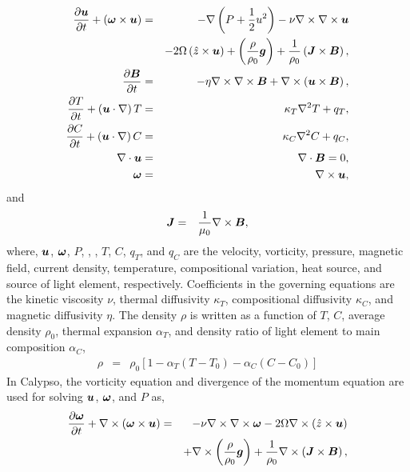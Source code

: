 \begin{eqnarray}
\frac{\partial \mbox{\boldmath$u$}}{\partial t} + \left(\mbox{\boldmath$\omega$} \times \mbox{\boldmath$u$}\right)
 & = & - \nabla \left(P+\frac{1}{2}u^{2} \right) -\nu \nabla \times \nabla \times \mbox{\boldmath$u$}
\nonumber \\
 & &  - 2 \Omega \left(\hat{z} \times \mbox{\boldmath$u$} \right)
     + \left( \frac{\rho}{\rho_{0}} \mbox{\boldmath$g$} \right)
     + \frac{1}{\rho_{0}} \left(\mbox{\boldmath$J$} \times \mbox{\boldmath$B$} \right),
\nonumber \\
 \frac{\partial \mbox{\boldmath$B$}}{\partial t}
 & = & -\eta \nabla \times \nabla \times \mbox{\boldmath$B$}
       + \nabla \times \left(\mbox{\boldmath$u$} \times \mbox{\boldmath$B$} \right),
\nonumber \\
\frac{\partial T}{\partial t} + \left(\mbox{\boldmath$u$} \cdot \nabla \right) T
 & = & \kappa_{T} \nabla^{2} T + q_{T},
\nonumber \\
\frac{\partial C}{\partial t} + \left(\mbox{\boldmath$u$} \cdot \nabla \right) C
 & = & \kappa_{C} \nabla^{2} C + q_{C},
\nonumber \\
\nabla \cdot \mbox{\boldmath$u$} & = & \nabla \cdot \mbox{\boldmath$B$} = 0,
\label{eq:conservation}
\nonumber \\
\mbox{\boldmath$\omega$} & = & \nabla \times \mbox{\boldmath$u$},
\nonumber
\end{eqnarray}
%
and
\begin{eqnarray}
\mbox{\boldmath$J$} & = & \frac{1}{\mu_{0}} \nabla \times \mbox{\boldmath$B$},
\nonumber
\end{eqnarray}
%
where, $\mbox{\boldmath$u$}$, $\mbox{\boldmath$\omega$}$, $P$, , , $T$, $C$, $q_{T}$, and $q_{C}$ are the velocity, vorticity, pressure, magnetic field, current density, temperature, compositional variation, heat source, and source of light element, respectively. Coefficients in the governing equations are the kinetic viscosity $\nu$, thermal diffusivity $\kappa_{T}$, compositional diffusivity $\kappa_{C}$, and magnetic diffusivity $\eta$. The density $\rho$ is written as a function of $T$, $C$, average density $\rho_{0}$, thermal expansion $\alpha_{T}$, and density ratio of light element to main composition $\alpha_{C}$,
%
\begin{eqnarray}
\rho & = & \rho_{0} \left[1 - \alpha_{T} \left( T - T_{0} \right)
                               - \alpha_{C} \left( C - C_{0} \right) \right]
\nonumber
\end{eqnarray}
%
In Calypso, the vorticity equation and divergence of the momentum equation are used for solving $\mbox{\boldmath$u$}$, $\mbox{\boldmath$\omega$}$, and $P$ as,
\begin{eqnarray}
\frac{\partial \mbox{\boldmath$\omega$}}{\partial t} + \nabla \times \left(\mbox{\boldmath$\omega$} \times \mbox{\boldmath$u$}\right)
 & = & -\nu \nabla \times \nabla \times \mbox{\boldmath$\omega$}
     - 2 \Omega \nabla \times \left(\hat{z} \times \mbox{\boldmath$u$} \right)
\nonumber \\
 & & + \nabla \times \left( \frac{\rho}{\rho_{0}} \mbox{\boldmath$g$} \right)
     + \frac{1}{\rho_{0}} \nabla \times \left(\mbox{\boldmath$J$} \times \mbox{\boldmath$B$} \right),
\nonumber
\end{eqnarray}
